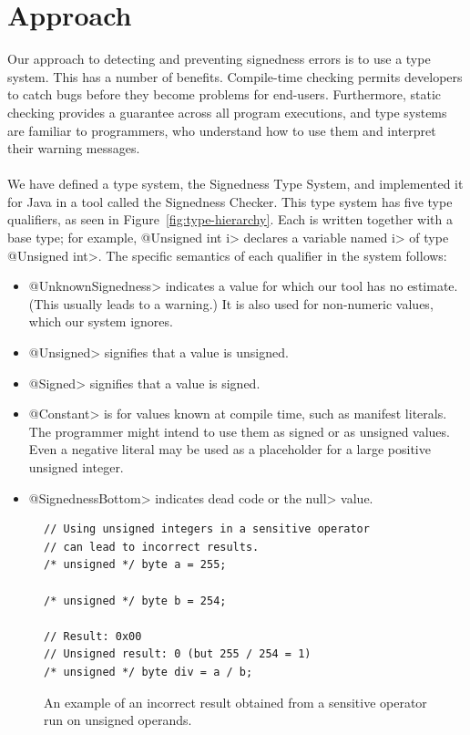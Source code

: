 \newpage
\section{Approach} \label{app}

Our approach to detecting and preventing signedness errors is to use a type
system. This has a number of benefits. Compile-time checking permits
developers
to catch bugs before they become problems for end-users. Furthermore, static
checking provides a guarantee across all program executions, and
type systems are familiar to programmers,
who understand how to use them
and interpret their warning messages.\\
\\
We have defined a type system, the Signedness Type System,
and implemented it for Java in a tool
called the Signedness Checker.
This type system has five type qualifiers, as seen in
Figure~\ref{fig:type-hierarchy}.  Each is written together
with a base type; for example, \<@Unsigned int i> declares a
variable named \<i> of type \<@Unsigned int>. The specific semantics of
each qualifier in the system follows:

\begin{itemize}
  \item \<@UnknownSignedness> indicates a value for which our tool
   has no estimate.  (This usually leads to a
    warning.)  It is also used for non-numeric
    values, which our system ignores.
  \item \<@Unsigned> signifies that a value is unsigned.
  \item \<@Signed> signifies that a value is signed.
  \item \<@Constant> is for values known at compile time, such as
    manifest literals.  The programmer might intend to
    use them as signed or as unsigned values.  Even a negative literal may
    be used as a placeholder for a large positive unsigned
    integer.
  \item \<@SignednessBottom> indicates dead code or the \<null> value.
\end{itemize}

\begin{figure}[t]
\begin{lstlisting}
// Using unsigned integers in a sensitive operator
// can lead to incorrect results.
/* unsigned */ byte a = 255;

/* unsigned */ byte b = 254;

// Result: 0x00
// Unsigned result: 0 (but 255 / 254 = 1)
/* unsigned */ byte div = a / b;
\end{lstlisting}
\vspace{-10pt}
\caption{An example of an incorrect result obtained from a sensitive operator
run on unsigned operands.}
\label{fig:sensitive}
\end{figure}

